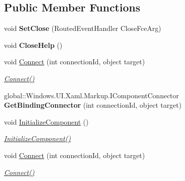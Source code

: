 \subsection*{Public Member Functions}
\begin{DoxyCompactItemize}
\item 
\mbox{\label{class_i_v_s_calc_1_1_in_app_doc_a50bd8e4067d5cff673ffec10afa28741}} 
void {\bfseries Set\+Close} (Routed\+Event\+Handler Close\+Fce\+Arg)
\item 
\mbox{\label{class_i_v_s_calc_1_1_in_app_doc_a4d7d431a16bd22c758419f62f9a70b0c}} 
void {\bfseries Close\+Help} ()
\item 
void \hyperlink{class_i_v_s_calc_1_1_in_app_doc_a470427a176a8d7a0de6c0b82a9a45c4b}{Connect} (int connection\+Id, object target)
\begin{DoxyCompactList}\small\item\em \hyperlink{class_i_v_s_calc_1_1_in_app_doc_a470427a176a8d7a0de6c0b82a9a45c4b}{Connect()} \end{DoxyCompactList}\item 
\mbox{\label{class_i_v_s_calc_1_1_in_app_doc_a98bf2af895c0ebf86088946fabacd814}} 
global\+::\+Windows.\+U\+I.\+Xaml.\+Markup.\+I\+Component\+Connector {\bfseries Get\+Binding\+Connector} (int connection\+Id, object target)
\item 
void \hyperlink{class_i_v_s_calc_1_1_in_app_doc_aaea69e2cf03d01b3fcd38f048dbeb569}{Initialize\+Component} ()
\begin{DoxyCompactList}\small\item\em \hyperlink{class_i_v_s_calc_1_1_in_app_doc_aaea69e2cf03d01b3fcd38f048dbeb569}{Initialize\+Component()} \end{DoxyCompactList}\item 
void \hyperlink{class_i_v_s_calc_1_1_in_app_doc_a470427a176a8d7a0de6c0b82a9a45c4b}{Connect} (int connection\+Id, object target)
\begin{DoxyCompactList}\small\item\em \hyperlink{class_i_v_s_calc_1_1_in_app_doc_a470427a176a8d7a0de6c0b82a9a45c4b}{Connect()} \end{DoxyCompactList}\item 
\mbox{\label{class_i_v_s_calc_1_1_in_app_doc_a98bf2af895c0ebf86088946fabacd814}} 

\end{DoxyCompactItemize}
